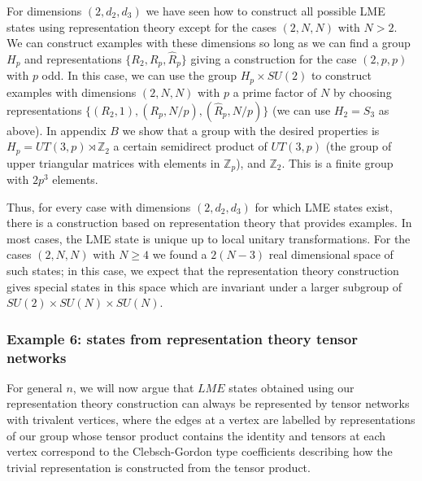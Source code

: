 \documentclass[12pt]{article}
\theoremstyle{definition}
\begin{document}
For dimensions $(2,d_2,d_3)$ we have seen how to construct all possible LME states using representation theory except for the cases $(2,N,N)$ with $N > 2$. We can construct examples with these dimensions so long as we can find a group $H_p$ and representations $\{R_2, R_p,\hat{R}_p\}$ giving a construction for the case $(2,p,p)$ with $p$ odd. In this case, we can use the group $H_p \times SU(2)$ to construct examples with dimensions $(2,N,N)$ with $p$ a prime factor of $N$ by choosing representations $\{(R_2,1), (R_p,N/p),(\hat{R}_p,N/p)\}$ (we can use $H_2 = S_3$ as above). In appendix $B$ we show that a group with the desired properties is $H_p = UT(3,p) \rtimes \mathbb{Z}_2$ a certain semidirect product of $UT(3,p)$ (the group of upper triangular matrices with elements in $\mathbb{Z}_p$), and $\mathbb{Z}_2$. This is a finite group with $2p^3$ elements.

Thus, for every case with dimensions $(2,d_2,d_3)$ for which LME states exist, there is a construction based on representation theory that provides examples. In most cases, the LME state is unique up to local unitary transformations. For the cases $(2,N,N)$ with $N \ge 4$ we found a $2(N-3)$ real dimensional space of such states; in this case, we expect that the representation theory construction gives special states in this space which are invariant under a larger subgroup of $SU(2) \times SU(N) \times SU(N)$.

\subsubsection*{Example 6: states from representation theory tensor networks}

For general $n$, we will now argue that $LME$ states obtained using our representation theory construction can always be represented by tensor networks with trivalent vertices, where the edges at a vertex are labelled by representations of our group whose tensor product contains the identity and tensors at each vertex correspond to the Clebsch-Gordon type coefficients describing how the trivial representation is constructed from the tensor product.
\end{document}
